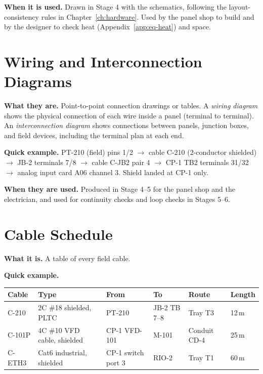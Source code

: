 \textbf{When it is used.} Drawn in Stage 4 with the schematics, following the layout-consistency rules in Chapter~\ref{ch:hardware}. Used by the panel shop to build and by the designer to check heat (Appendix~\ref{app:eq-heat}) and space.

\section{Wiring and Interconnection Diagrams}
\textbf{What they are.} Point-to-point connection drawings or tables. A \emph{wiring diagram} shows the physical connection of each wire inside a panel (terminal to terminal). An \emph{interconnection diagram} shows connections between panels, junction boxes, and field devices, including the terminal plan at each end.

\textbf{Quick example.} PT-210 (field) pins 1/2 $\rightarrow$ cable C-210 (2-conductor shielded) $\rightarrow$ JB-2 terminals 7/8 $\rightarrow$ cable C-JB2 pair 4 $\rightarrow$ CP-1 TB2 terminals 31/32 $\rightarrow$ analog input card A06 channel 3. Shield landed at CP-1 only.

\textbf{When they are used.} Produced in Stage 4--5 for the panel shop and the electrician, and used for continuity checks and loop checks in Stages 5--6.

\section{Cable Schedule}
\textbf{What it is.} A table of every field cable.

\textbf{Quick example.}
\begin{center}
\begin{small}
\begin{tabular}{@{}P{1.74cm}P{4.14cm}P{2.72cm}P{2.61cm}P{2.50cm}P{1.95cm}@{}}
\toprule
{}\textbf{Cable} & \textbf{Type} & \textbf{From} & \textbf{To} & \textbf{Route} & \textbf{Length} \\
\midrule
C-210 & 2C \#18 shielded, PLTC & PT-210 & JB-2 TB 7--8 & Tray T3 & 12\,m \\
C-101P & 4C \#10 VFD cable, shielded & CP-1 VFD-101 & M-101 & Conduit CD-4 & 25\,m \\
C-ETH3 & Cat6 industrial, shielded & CP-1 switch port 3 & RIO-2 & Tray T1 & 60\,m \\
\bottomrule
\end{tabular}
\end{small}
\end{center}

